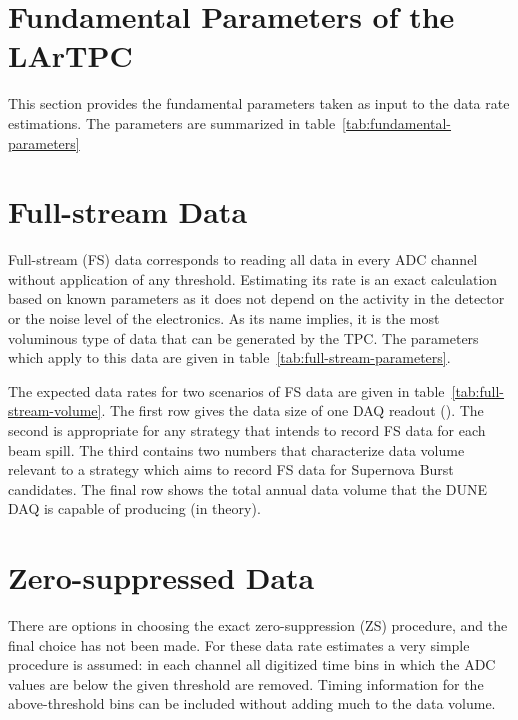 \section{Fundamental Parameters of the LArTPC}

This section provides the fundamental parameters taken as input to the
data rate estimations.
The parameters are summarized in
table~\ref{tab:fundamental-parameters}



\section{Full-stream Data}

Full-stream (FS) data corresponds to reading all data in every ADC channel without application of any threshold.
Estimating its rate is an exact calculation based on known parameters as it does not depend on
the activity in the detector or the noise level of the electronics.
As its name implies, it is the most voluminous type of data that can be generated by the TPC.
The parameters which apply to this data are given in table~\ref{tab:full-stream-parameters}.



The expected data rates for two scenarios of FS data are given
in table~\ref{tab:full-stream-volume}.
The first row gives the data size of one DAQ readout (\daqreadouttime).
The second is appropriate for any strategy that intends to record FS
data for each beam spill.
The third contains two numbers that characterize data volume relevant to a strategy which aims to record FS data
for Supernova Burst candidates.
The final row  shows the total annual data volume that the DUNE DAQ is capable of producing (in theory).




\section{Zero-suppressed Data}

There are options in choosing the exact zero-suppression (ZS) procedure,
and the final choice has not been made.
For these data rate estimates a very simple procedure is assumed: in each
channel all digitized time bins in which the ADC values are below
the given threshold are removed. Timing information for the above-threshold bins can be included without
adding much to the data volume.


